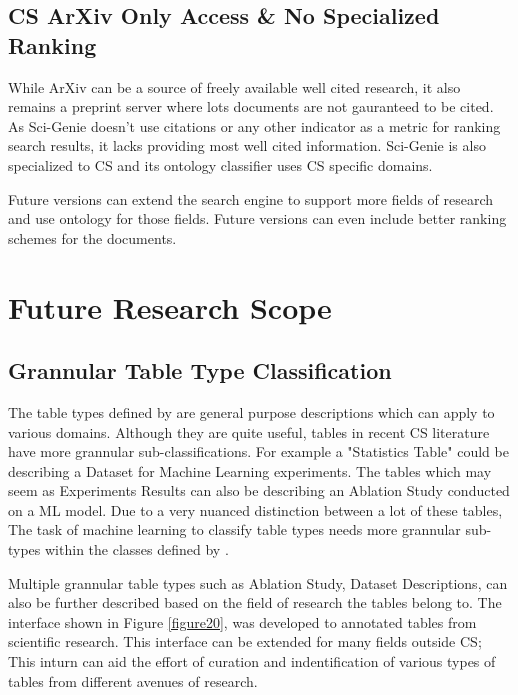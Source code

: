 \subsection{CS ArXiv Only Access \& No Specialized Ranking}
While ArXiv can be a source of freely available well cited research, it also remains a preprint server where lots documents are not gauranteed to be cited. As Sci-Genie doesn't use citations or any other indicator as a metric for ranking search results, it lacks providing most well cited information. Sci-Genie is also specialized to CS and its ontology classifier uses CS specific domains. 

Future versions can extend the search engine to support more fields of research and use ontology for those fields. Future versions can even include better ranking schemes for the documents.  

\section{Future Research Scope}
\label{conclusion:future-scope}
\subsection{Grannular Table Type Classification}
\label{conclusion:future-scope:type-class}

The table types defined by \cite{kim2012scientific} are general purpose descriptions which can apply to various domains. Although they are quite useful, tables in recent CS literature have more grannular sub-classifications. For example a "Statistics Table" could be describing a Dataset for Machine Learning experiments. The tables which may seem as Experiments Results can also be describing an Ablation Study conducted on a ML model. Due to a very nuanced distinction between a lot of these tables, The task of machine learning to classify table types needs more grannular sub-types within the classes defined by \cite{kim2012scientific}. 

Multiple grannular table types such as Ablation Study, Dataset Descriptions, can also be further described based on the field of research the tables belong to. The interface shown in Figure \ref{figure20}, was developed to annotated tables from scientific research. This interface can be extended for many fields outside CS; This inturn can aid the effort of curation and indentification of various types of tables from different avenues of research. 

